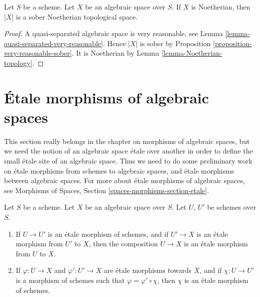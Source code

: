 \begin{lemma}
\label{lemma-Noetherian-sober}
Let $S$ be a scheme. Let $X$ be an algebraic space over $S$.
If $X$ is Noetherian, then $|X|$ is a sober Noetherian topological space.
\end{lemma}

\begin{proof}
A quasi-separated algebraic space is very reasonable, see
Lemma \ref{lemma-quasi-separated-very-reasonable}.
Hence $|X|$ is sober by
Proposition \ref{proposition-very-reasonable-sober}.
It is Noetherian by
Lemma \ref{lemma-Noetherian-topology}.
\end{proof}




\section{\'Etale morphisms of algebraic spaces}
\label{section-etale-morphisms}

\noindent
This section really belongs in the chapter on morphisms of algebraic
spaces, but we need the notion of an algebraic space \'etale over another
in order to define the small \'etale site of an algebraic space.
Thus we need to do some preliminary work on \'etale morphisms from schemes to
algebraic spaces, and \'etale morphisms between algebraic spaces.
For more about \'etale morphisms of algebraic spaces, see
Morphisms of Spaces, Section \ref{spaces-morphisms-section-etale}.

\begin{lemma}
\label{lemma-etale-over-space}
Let $S$ be a scheme.
Let $X$ be an algebraic space over $S$.
Let $U$, $U'$ be schemes over $S$.
\begin{enumerate}
\item If $U \to U'$ is an \'etale morphism of schemes, and
if $U' \to X$ is an \'etale morphism from $U'$ to $X$, then the
composition $U \to X$ is an \'etale morphism from $U$ to $X$.
\item If $\varphi : U \to X$ and $\varphi' : U' \to X$ are
\'etale morphisms towards $X$, and if $\chi : U \to U'$ is a
morphism of schemes such that $\varphi = \varphi' \circ \chi$,
then $\chi$ is an \'etale morphism of schemes.
\end{enumerate}
\end{lemma}

